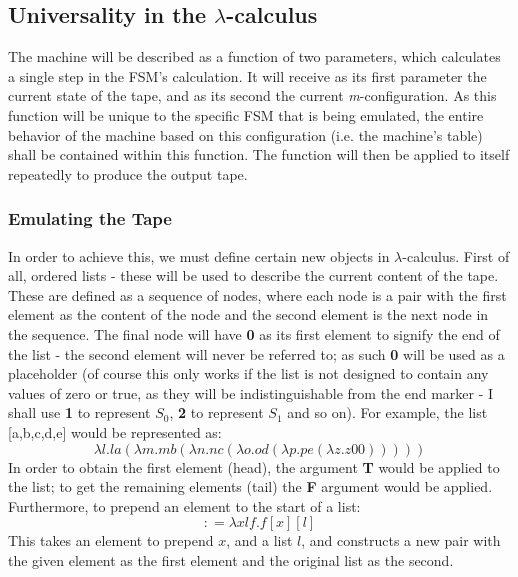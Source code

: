 \documentclass[Master.tex]{subfiles}
\begin{document}
\subsection{Universality in the $\lambda$-calculus}

The machine will be described as a function of two parameters, which calculates a single step in the FSM's calculation. It will receive as its first parameter the current state of the tape, and as its second the current \textit{m}-configuration. As this function will be unique to the specific FSM that is being emulated, the entire behavior of the machine based on this configuration (i.e. the machine's table) shall be contained within this function. The function will then be applied to itself repeatedly to produce the output tape.

\subsubsection{Emulating the Tape}
In order to achieve this, we must define certain new objects in $\lambda$-calculus. First of all, ordered lists - these will be used to describe the current content of the tape. These are defined as a sequence of nodes, where each node is a pair with the first element as the content of the node and the second element is the next node in the sequence. The final node will have \textbf{0} as its first element to signify the end of the list - the second element will never be referred to; as such \textbf{0} will be used as a placeholder (of course this only works if the list is not designed to contain any values of zero or true, as they will be indistinguishable from the end marker - I shall use \textbf{1} to represent $S_0$, \textbf{2} to represent $S_1$ and so on). For example, the list [a,b,c,d,e] would be represented as:
\begin{equation*}
\lambda l.la(\lambda m.mb(\lambda n.nc(\lambda o.od(\lambda p.pe(\lambda z.z\bm{\mathrm{00}})))))
\end{equation*}
In order to obtain the first element (head), the argument \textbf{T} would be applied to the list; to get the remaining elements (tail) the \textbf{F} argument would be applied. 
Furthermore, to prepend an element to the start of a list:
\begin{equation*}
\bm{\mathrm{:}} = \lambda xlf.f[x][l]
\end{equation*}
This takes an element to prepend $x$, and a list $l$, and constructs a new pair with the given element as the first element and the original list as the second.
 
\end{document}

